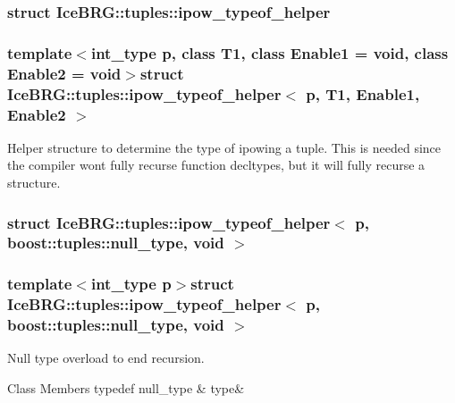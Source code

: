 \subsubsection{struct Ice\+B\+R\+G\+:\+:tuples\+:\+:ipow\+\_\+typeof\+\_\+helper}
\subsubsection*{template$<$int\+\_\+type p, class T1, class Enable1 = void, class Enable2 = void$>$struct Ice\+B\+R\+G\+::tuples\+::ipow\+\_\+typeof\+\_\+helper$<$ p, T1, Enable1, Enable2 $>$}

Helper structure to determine the type of ipowing a tuple. This is needed since the compiler won\textquotesingle{}t fully recurse function decltypes, but it will fully recurse a structure. \label{structIceBRG_1_1tuples_1_1ipow__typeof__helper_3_01p_00_01boost_1_1tuples_1_1null__type_00_01void_01_4}
\hypertarget{namespaceIceBRG_1_1tuples_structIceBRG_1_1tuples_1_1ipow__typeof__helper_3_01p_00_01boost_1_1tuples_1_1null__type_00_01void_01_4}{}
\subsubsection{struct Ice\+B\+R\+G\+:\+:tuples\+:\+:ipow\+\_\+typeof\+\_\+helper$<$ p, boost\+:\+:tuples\+:\+:null\+\_\+type, void $>$}
\subsubsection*{template$<$int\+\_\+type p$>$struct Ice\+B\+R\+G\+::tuples\+::ipow\+\_\+typeof\+\_\+helper$<$ p, boost\+::tuples\+::null\+\_\+type, void $>$}

Null type overload to end recursion. \begin{DoxyFields}{Class Members}
\hypertarget{namespaceIceBRG_1_1tuples_a57be2e737cd2b0be82546d8aa85323c6}{}typedef null\+\_\+type\label{namespaceIceBRG_1_1tuples_a57be2e737cd2b0be82546d8aa85323c6}
&
type&
\\
\hline

\end{DoxyFields}
\label{structIceBRG_1_1tuples_1_1ipow__typeof__helper_3_01p_00_01T1_00_01BRG__S__IS__TUPLE_07T1_08_4}
\hypertarget{namespaceIceBRG_1_1tuples_structIceBRG_1_1tuples_1_1ipow__typeof__helper_3_01p_00_01T1_00_01BRG__S__IS__TUPLE_07T1_08_4}{}

